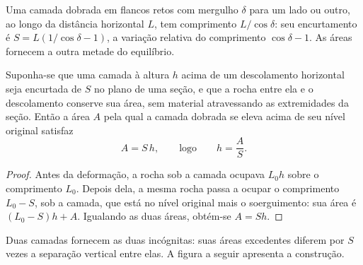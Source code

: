 Uma camada dobrada em flancos retos com mergulho $\delta$ para um lado ou outro, ao longo da
distância horizontal $L$, tem comprimento $L/\cos\delta$: seu encurtamento é
$S = L(1/\cos\delta - 1)$, a variação relativa do comprimento $\cos\delta - 1$.
As áreas fornecem a outra metade do equilíbrio.

\begin{proposition}\label{prop:b3:structural-analysis:detachment}
Suponha-se que uma camada à altura $h$ acima de um descolamento horizontal seja encurtada de $S$
no plano de uma seção, e que a rocha entre ela e o descolamento
conserve sua área, sem material atravessando as extremidades da seção. Então a
área $A$ pela qual a camada dobrada se eleva acima de seu nível original satisfaz
\[
  A = S\,h , \qquad\text{logo}\qquad h = \frac AS .
\]
\end{proposition}

\begin{proof}
Antes da deformação, a rocha sob a camada ocupava $L_0 h$ sobre o
comprimento $L_0$. Depois dela, a mesma rocha passa a ocupar o comprimento $L_0 - S$, sob
a camada, que está no nível original mais o soerguimento: sua área é
$(L_0 - S)h + A$. Igualando as duas áreas, obtém-se $A = Sh$.
\end{proof}

Duas camadas fornecem as duas incógnitas: suas áreas excedentes diferem por $S$ vezes a
separação vertical entre elas. A figura a seguir apresenta a construção.


